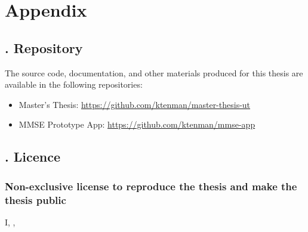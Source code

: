 \appendix

\section*{Appendix}

\renewcommand{\theappendixcounter}{\Roman{appendixcounter}}



\subsection*{. Repository} \label{appendix:repository}


The source code, documentation, and other materials produced for this thesis are available in the following repositories:
\begin{itemize}
    \item Master's Thesis: \url{https://github.com/ktenman/master-thesis-ut}
    \item MMSE Prototype App: \url{https://github.com/ktenman/mmse-app}
\end{itemize}



\subsection*{. Licence}


\subsubsection*{Non-exclusive license to reproduce the thesis and make the thesis public}

I, \textbf{\authorname}, %

